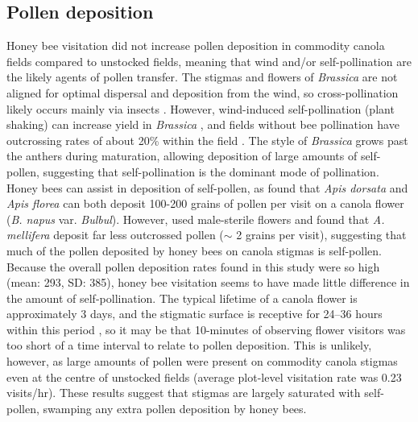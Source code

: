 \documentclass[12pt]{article} %
\begin{document}
\subsection{Pollen deposition}
Honey bee visitation did not increase pollen deposition in commodity canola fields compared to unstocked fields, meaning that wind and/or self-pollination are the likely agents of pollen transfer.
The stigmas and flowers of \emph{Brassica} are not aligned for optimal dispersal and deposition from the wind, so cross-pollination likely occurs mainly via insects \citep{mesquida1982,cresswell2004}.
However, wind-induced self-pollination (plant shaking) can increase yield in \textit{Brassica} \citep{williams1986, mesquida1988c}, and fields without bee pollination have outcrossing rates of about 20\% within the field \citep{rakow1987,becker1992}.
The style of \textit{Brassica} grows past the anthers during maturation, allowing deposition of large amounts of self-pollen, suggesting that self-pollination is the dominant mode of pollination.
Honey bees can assist in deposition of self-pollen, as \citet{ali2011} found that \textit{Apis dorsata} and \textit{Apis florea} can both deposit 100-200 grains of pollen per visit on a canola flower (\emph{B. napus} var. \emph{Bulbul}).
However, \citet{waytesMsc} used male-sterile flowers and found that \textit{A. mellifera} deposit far less outcrossed pollen ($\sim$ 2 grains per visit), suggesting that much of the pollen deposited by honey bees on canola stigmas is self-pollen. 
Because the overall pollen deposition rates found in this study were so high (mean: 293, SD: 385), honey bee visitation seems to have made little difference in the amount of self-pollination.
The typical lifetime of a canola flower is approximately 3 days, and the stigmatic surface is receptive for 24--36 hours within this period \citep{eisikowitch1981,hoyle2007}, so it may be that 10-minutes of observing flower visitors was too short of a time interval to relate to pollen deposition.
This is unlikely, however, as large amounts of pollen were present on commodity canola stigmas even at the centre of unstocked fields (average plot-level visitation rate was 0.23 visits/hr).
These results suggest that stigmas are largely saturated with self-pollen, swamping any extra pollen deposition by honey bees.
\end{document}
